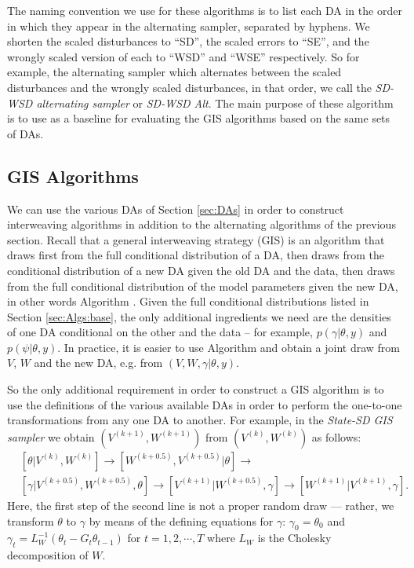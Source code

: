 \documentclass{article}
\begin{document}
The naming convention we use for these algorithms is to list each DA in the order in which they appear in the alternating sampler, separated by hyphens. We shorten the scaled disturbances to ``SD'', the scaled errors to ``SE'', and the wrongly scaled version of each to ``WSD'' and ``WSE'' respectively. So for example, the alternating sampler which alternates between the scaled disturbances and the wrongly scaled disturbances, in that order, we call the {\it SD-WSD alternating sampler} or {\it SD-WSD Alt}. The main purpose of these algorithm is to use as a baseline for evaluating the GIS algorithms based on the same sets of DAs.

\subsection{GIS Algorithms}\label{sec:Algs:GIS}
We can use the various DAs of Section \ref{sec:DAs} in order to construct interweaving algorithms in addition to the alternating algorithms of the previous section. Recall that a general interweaving strategy (GIS) is an algorithm that draws first from the full conditional distribution of a DA, then draws from the conditional distribution of a new DA given the old DA and the data, then draws from the full conditional distribution of the model parameters given the new DA, in other words Algorithm . Given the full conditional distributions listed in Section \ref{sec:Algs:base}, the only additional ingredients we need are the densities of one DA conditional on the other and the data -- for example, $p(\gamma|\theta,y)$ and $p(\psi|\theta,y)$. In practice, it is easier to use Algorithm  and obtain a joint draw from $V$, $W$ and the new DA, e.g. from $(V,W,\gamma|\theta,y)$.

So the only additional requirement in order to construct a GIS algorithm is to use the definitions of the various available DAs in order to perform the one-to-one transformations from any one DA to another. For example, in the {\it State-SD GIS sampler} we obtain $(V^{(k+1)},W^{(k+1)})$ from $(V^{(k)},W^{(k)})$ as follows:
\begin{align*}
&[\theta|V^{(k)},W^{(k)}] \to [W^{(k+0.5)},V^{(k+0.5)}|\theta] \to\\
&[\gamma|V^{(k+0.5)},W^{(k+0.5)},\theta] \to [V^{(k+1)}|W^{(k+0.5)},\gamma] \to [W^{(k+1)}|V^{(k+1)},\gamma].
\end{align*}
Here, the first step of the second line is not a proper random draw --- rather, we transform $\theta$ to $\gamma$ by means of the defining equations for $\gamma$: $\gamma_0=\theta_0$ and $\gamma_t = L_W^{-1}(\theta_t - G_t\theta_{t-1})$ for $t=1,2,\cdots,T$ where $L_W$ is the Cholesky decomposition of $W$. 
\end{document}

